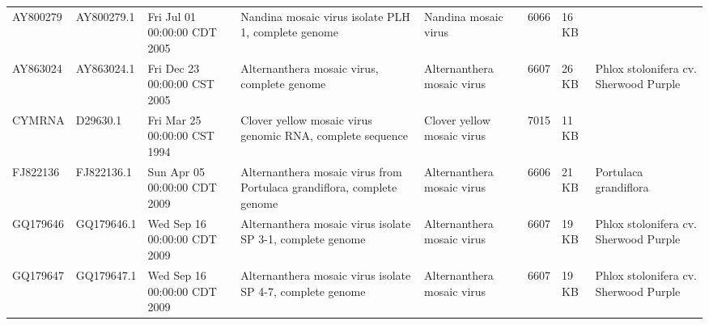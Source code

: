 \documentclass[11pt]{article}
\begin{document}
\begin{supptable}[ht]
{{\begin{tabular}{@{}llllllll@{}}
AY800279 & AY800279.1 & Fri Jul 01 00:00:00 CDT 2005 & Nandina mosaic virus isolate PLH 1, complete genome                                                                                                                                                                                                              & Nandina mosaic virus           & 6066            & 16 KB &                                       \\
AY863024 & AY863024.1 & Fri Dec 23 00:00:00 CST 2005 & Alternanthera mosaic virus, complete genome                                                                                                                                                                                                                      & Alternanthera mosaic virus     & 6607            & 26 KB & Phlox stolonifera cv. Sherwood Purple \\
CYMRNA   & D29630.1   & Fri Mar 25 00:00:00 CST 1994 & Clover yellow mosaic virus genomic RNA, complete sequence                                                                                                                                                                                                        & Clover yellow mosaic virus     & 7015            & 11 KB &                                       \\
FJ822136 & FJ822136.1 & Sun Apr 05 00:00:00 CDT 2009 & Alternanthera mosaic virus from Portulaca grandiflora, complete genome                                                                                                                                                                                           & Alternanthera mosaic virus     & 6606            & 21 KB & Portulaca grandiflora                 \\
GQ179646 & GQ179646.1 & Wed Sep 16 00:00:00 CDT 2009 & Alternanthera mosaic virus isolate SP 3-1, complete genome                                                                                                                                                                                                       & Alternanthera mosaic virus     & 6607            & 19 KB & Phlox stolonifera cv. Sherwood Purple \\
GQ179647 & GQ179647.1 & Wed Sep 16 00:00:00 CDT 2009 & Alternanthera mosaic virus isolate SP 4-7, complete genome                                                                                                                                                                                                       & Alternanthera mosaic virus     & 6607            & 19 KB & Phlox stolonifera cv. Sherwood Purple \\

\end{tabular}}}
\end{supptable}
\end{document}

